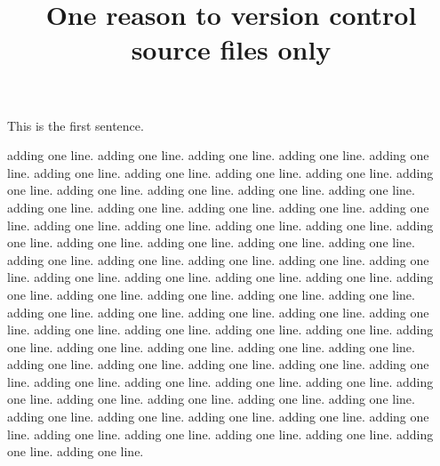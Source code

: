 \documentclass{article}
\title{One reason to version control source files only}
\begin{document}
\maketitle

This is the first sentence.

adding one line.
adding one line.
adding one line.
adding one line.
adding one line.
adding one line.
adding one line.
adding one line.
adding one line.
adding one line.
adding one line.
adding one line.
adding one line.
adding one line.
adding one line.
adding one line.
adding one line.
adding one line.
adding one line.
adding one line.
adding one line.
adding one line.
adding one line.
adding one line.
adding one line.
adding one line.
adding one line.
adding one line.
adding one line.
adding one line.
adding one line.
adding one line.
adding one line.
adding one line.
adding one line.
adding one line.
adding one line.
adding one line.
adding one line.
adding one line.
adding one line.
adding one line.
adding one line.
adding one line.
adding one line.
adding one line.
adding one line.
adding one line.
adding one line.
adding one line.
adding one line.
adding one line.
adding one line.
adding one line.
adding one line.
adding one line.
adding one line.
adding one line.
adding one line.
adding one line.
adding one line.
adding one line.
adding one line.
adding one line.
adding one line.
adding one line.
adding one line.
adding one line.
adding one line.
adding one line.
adding one line.
adding one line.
adding one line.
adding one line.
adding one line.
adding one line.
adding one line.
adding one line.
adding one line.
adding one line.
adding one line.
\end{document}
